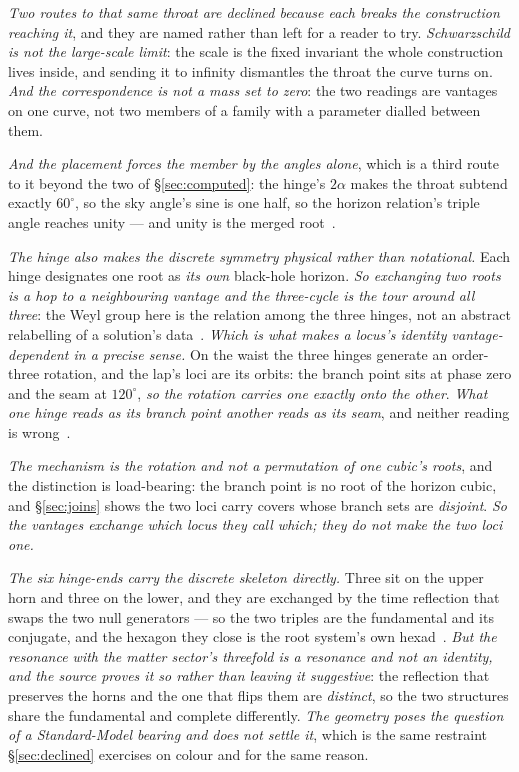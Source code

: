 \documentclass[11pt,a4paper]{article}
\theoremstyle{plain}
\theoremstyle{definition}
\begin{document}
\emph{Two routes to that same throat are declined because each breaks the construction reaching it}, and
they are named rather than left for a reader to try. \emph{Schwarzschild is not the large-scale limit}: the
scale is the fixed invariant the whole construction lives inside, and sending it to infinity dismantles the
throat the curve turns on. \emph{And the correspondence is not a mass set to zero}: the two readings are
vantages on one curve, not two members of a family with a parameter dialled between them.

\emph{And the placement forces the member by the angles alone}, which is a third route to it beyond the two
of \S\ref{sec:computed}: the hinge's $2\alpha$ makes the throat subtend exactly $60^{\circ}$, so the sky
angle's sine is one half, so the horizon relation's triple angle reaches unity --- and unity is the merged
root~\cite{JanzenSlicing}.

\emph{The hinge also makes the discrete symmetry physical rather than notational.} Each hinge designates one
root as \emph{its own} black-hole horizon. \emph{So exchanging two roots is a hop to a neighbouring vantage
and the three-cycle is the tour around all three}: the Weyl group here is the relation among the three
hinges, not an abstract relabelling of a solution's
data~\cite{JanzenSlicing,JanzenGroupoid}. \emph{Which is what makes a locus's identity vantage-dependent in a
precise sense.} On the waist the three hinges generate an order-three rotation, and the lap's loci are its
orbits: the branch point sits at phase zero and the seam at $120^{\circ}$, \emph{so the rotation carries one
exactly onto the other}. \emph{What one hinge reads as its branch point another reads as its seam}, and
neither reading is wrong~\cite{JanzenSlicing}.

\emph{The mechanism is the rotation and not a permutation of one cubic's roots}, and the distinction is
load-bearing: the branch point is no root of the horizon cubic, and \S\ref{sec:joins} shows the two loci
carry covers whose branch sets are \emph{disjoint}. \emph{So the vantages exchange which locus they call
which; they do not make the two loci one.}

\emph{The six hinge-ends carry the discrete skeleton directly.} Three sit on the upper horn and three on the
lower, and they are exchanged by the time reflection that swaps the two null generators --- so the two
triples are the fundamental and its conjugate, and the hexagon they close is the root system's own
hexad~\cite{JanzenSlicing}. \emph{But the resonance with the matter sector's threefold is a resonance and not
an identity, and the source proves it so rather than leaving it suggestive}: the reflection that preserves
the horns and the one that flips them are \emph{distinct}, so the two structures share the fundamental and
complete differently. \emph{The geometry poses the question of a Standard-Model bearing and does not settle
it}, which is the same restraint \S\ref{sec:declined} exercises on colour and for the same reason.
\end{document}
